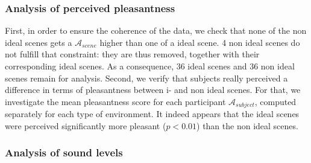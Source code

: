 \documentclass[12pt]{elsarticle}
\begin{document}
\subsubsection*{Analysis of perceived pleasantness}


First, in order to ensure the coherence of the data, we check that none of the non ideal scenes gets a $\mathcal{A}_{scene}$ higher than one of a ideal scene. 4 non ideal scenes do not fulfill that constraint: they are thus removed, together with their corresponding ideal scenes. As a consequence, 36 ideal scenes and 36 non ideal scenes remain for analysis. Second, we verify that subjects really perceived a difference in terms of pleasantness between i- and non ideal scenes. For that, we investigate the mean pleasantness score for each participant $\mathcal{A}_{subject}$, computed separately for each type of environment. It indeed appears that the ideal scenes were perceived significantly more pleasant ($p < 0.01$) than the non ideal scenes.


\subsubsection*{Analysis of sound levels}
\end{document}
